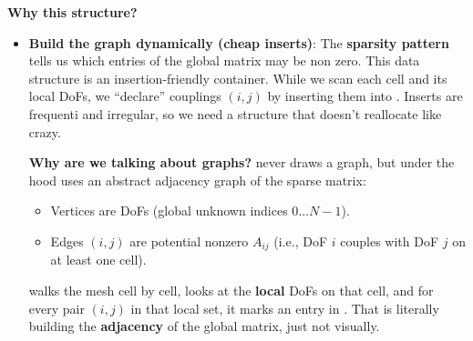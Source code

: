 \begin{enumerate}
    \textcolor{Green3}{ \textbf{Why this structure?}}
    \begin{itemize}
        \item \textbf{Build the graph dynamically (cheap inserts)}:  The \textbf{sparsity pattern} tells us which entries of the global matrix may be non zero. This data structure is an insertion-friendly container. While we scan each cell and its local DoFs, we ``declare'' couplings $(i,j)$ by inserting them into . Inserts are frequenti and irregular, so we need a structure that doesn't reallocate like crazy.
        
        \textcolor{Green3}{ \textbf{Why are we talking about graphs?}}  never draws a graph, but under the hood uses an abstract adjacency graph of the sparse matrix:
        \begin{itemize}
            \item Vertices are DoFs (global unknown indices $0 \dots N-1$).
            \item Edges $(i,j)$ are potential nonzero $A_{ij}$ (i.e., DoF $i$ couples with DoF $j$ on at least one cell).
        \end{itemize}
         walks the mesh cell by cell, looks at the \textbf{local} DoFs on that cell, and for every pair $(i,j)$ in that local set, it marks an entry in . That is literally building the \textbf{adjacency} of the global matrix, just not visually.


\end{itemize}
\end{enumerate}
